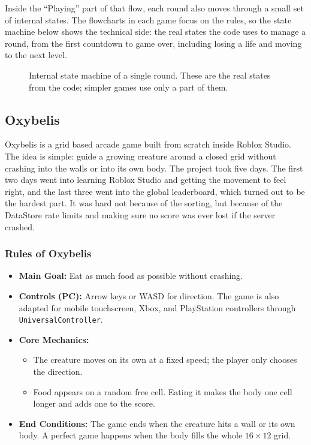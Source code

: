 \documentclass[12pt,letterpaper]{article}
\begin{document}
Inside the ``Playing'' part of that flow, each round also moves through a small set of internal states. The flowcharts in each game focus on the rules, so the state machine below shows the technical side: the real states the code uses to manage a round, from the first countdown to game over, including losing a life and moving to the next level.

\begin{figure}[H]
  \centering
  
  \caption{Internal state machine of a single round. These are the real states from the code; simpler games use only a part of them.}
  \label{fig:round_states}
\end{figure}

\clearpage

\subsection{Oxybelis}

Oxybelis is a grid based arcade game built from scratch inside Roblox Studio. The idea is simple: guide a growing creature around a closed grid without crashing into the walls or into its own body. The project took five days. The first two days went into learning Roblox Studio and getting the movement to feel right, and the last three went into the global leaderboard, which turned out to be the hardest part. It was hard not because of the sorting, but because of the DataStore rate limits and making sure no score was ever lost if the server crashed.

\subsubsection{Rules of Oxybelis}
\begin{itemize}
  \item \textbf{Main Goal:} Eat as much food as possible without crashing.
  \item \textbf{Controls (PC):} Arrow keys or WASD for direction. The game is also adapted for mobile touchscreen, Xbox, and PlayStation controllers through \texttt{UniversalController}.
  \item \textbf{Core Mechanics:}
  \begin{itemize}
    \item The creature moves on its own at a fixed speed; the player only chooses the direction.
    \item Food appears on a random free cell. Eating it makes the body one cell longer and adds one to the score.
  \end{itemize}
  \item \textbf{End Conditions:} The game ends when the creature hits a wall or its own body. A perfect game happens when the body fills the whole $16 \times 12$ grid.
\end{itemize}
\end{document}
